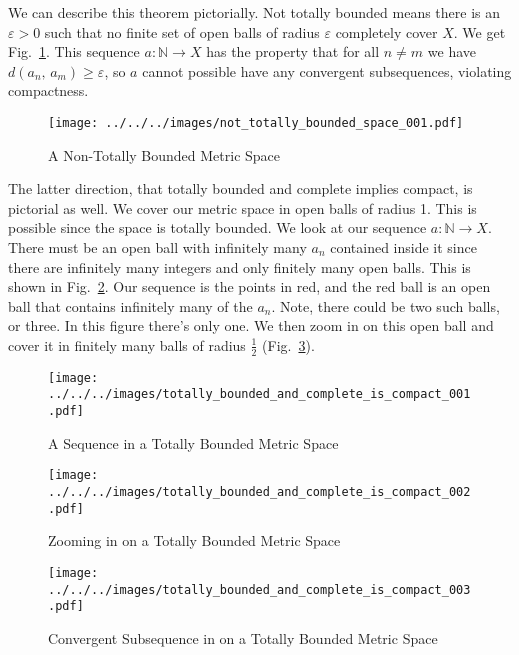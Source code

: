 \documentclass{article}
\theoremstyle{plain}
\theoremstyle{normal}
\begin{document}
        We can describe this theorem pictorially. Not totally bounded means
        there is an $\varepsilon>0$ such that no finite set of open balls of
        radius $\varepsilon$ completely cover $X$. We get
        Fig.~\ref{fig:not_totally_bounded_space_001}. This sequence
        $a:\mathbb{N}\rightarrow{X}$ has the property that for all
        $n\ne{m}$ we have $d(a_{n},\,a_{m})\geq\varepsilon$, so $a$ cannot
        possible have any convergent subsequences, violating compactness.
        \begin{figure}
            \centering
            \texttt{[image: ../../../images/not\_totally\_bounded\_space\_001.pdf]}
            \caption{A Non-Totally Bounded Metric Space}
            \label{fig:not_totally_bounded_space_001}
        \end{figure}
        The latter direction, that totally bounded and complete implies
        compact, is pictorial as well. We cover our metric space in open
        balls of radius 1. This is possible since the space is totally bounded.
        We look at our sequence $a:\mathbb{N}\rightarrow{X}$. There must be an
        open ball with infinitely many $a_{n}$ contained inside it since there
        are infinitely many integers and only finitely many open balls.
        This is shown in
        Fig.~\ref{fig:totally_bounded_and_complete_is_compact_001}. Our
        sequence is the points in red, and the red ball is an open ball that
        contains infinitely many of the $a_{n}$. Note, there could be two such
        balls, or three. In this figure there's only one. We then zoom in on
        this open ball and cover it in finitely many balls of radius
        $\frac{1}{2}$ (Fig.~\ref{fig:totally_bounded_and_complete_is_compact_002}).
        \begin{figure}
            \centering
            \texttt{[image: ../../../images/totally\_bounded\_and\_complete\_is\_compact\_001.pdf]}
            \caption{A Sequence in a Totally Bounded Metric Space}
            \label{fig:totally_bounded_and_complete_is_compact_001}
        \end{figure}
        \begin{figure}
            \centering
            \texttt{[image: ../../../images/totally\_bounded\_and\_complete\_is\_compact\_002.pdf]}
            \caption{Zooming in on a Totally Bounded Metric Space}
            \label{fig:totally_bounded_and_complete_is_compact_002}
        \end{figure}
        \begin{figure}
            \centering
            \texttt{[image: ../../../images/totally\_bounded\_and\_complete\_is\_compact\_003.pdf]}
            \caption{Convergent Subsequence in on a Totally Bounded Metric Space}
            \label{fig:totally_bounded_and_complete_is_compact_003}
        \end{figure}
\end{document}

